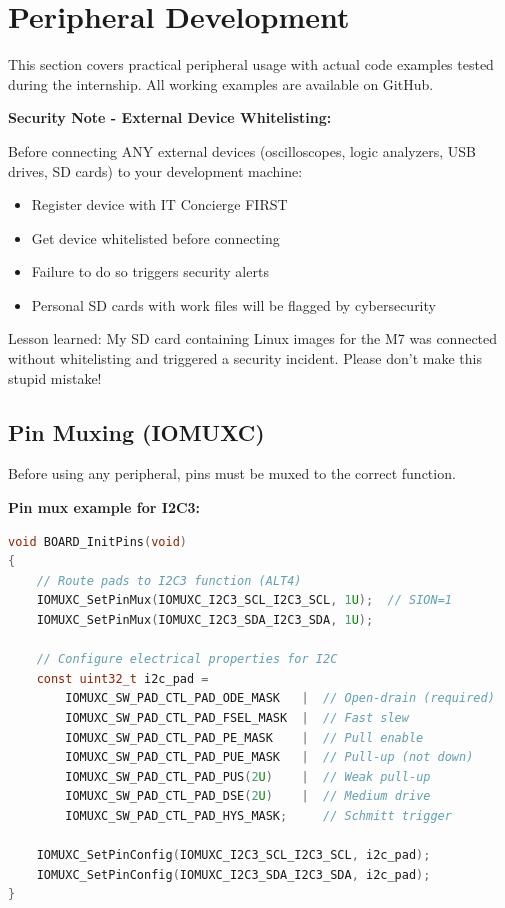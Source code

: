 \documentclass[12pt,a4paper]{report}
\begin{document}
\section{Peripheral Development}

This section covers practical peripheral usage with actual code examples tested during the internship. All working examples are available on GitHub.

\begin{important}
\textbf{Security Note - External Device Whitelisting:}

Before connecting ANY external devices (oscilloscopes, logic analyzers, USB drives, SD cards) to your development machine:
\begin{itemize}
    \item Register device with IT Concierge FIRST
    \item Get device whitelisted before connecting
    \item Failure to do so triggers security alerts
    \item Personal SD cards with work files will be flagged by cybersecurity
\end{itemize}

Lesson learned: My SD card containing Linux images for the M7 was connected without whitelisting and triggered a security incident. Please don't make this stupid mistake!
\end{important}

\subsection{Pin Muxing (IOMUXC)}

Before using any peripheral, pins must be muxed to the correct function.

\textbf{Pin mux example for I2C3:}

\begin{lstlisting}[language=c]
void BOARD_InitPins(void)
{
    // Route pads to I2C3 function (ALT4)
    IOMUXC_SetPinMux(IOMUXC_I2C3_SCL_I2C3_SCL, 1U);  // SION=1
    IOMUXC_SetPinMux(IOMUXC_I2C3_SDA_I2C3_SDA, 1U);

    // Configure electrical properties for I2C
    const uint32_t i2c_pad =
        IOMUXC_SW_PAD_CTL_PAD_ODE_MASK   |  // Open-drain (required)
        IOMUXC_SW_PAD_CTL_PAD_FSEL_MASK  |  // Fast slew
        IOMUXC_SW_PAD_CTL_PAD_PE_MASK    |  // Pull enable
        IOMUXC_SW_PAD_CTL_PAD_PUE_MASK   |  // Pull-up (not down)
        IOMUXC_SW_PAD_CTL_PAD_PUS(2U)    |  // Weak pull-up
        IOMUXC_SW_PAD_CTL_PAD_DSE(2U)    |  // Medium drive
        IOMUXC_SW_PAD_CTL_PAD_HYS_MASK;     // Schmitt trigger

    IOMUXC_SetPinConfig(IOMUXC_I2C3_SCL_I2C3_SCL, i2c_pad);
    IOMUXC_SetPinConfig(IOMUXC_I2C3_SDA_I2C3_SDA, i2c_pad);
}
\end{lstlisting}
\end{document}
